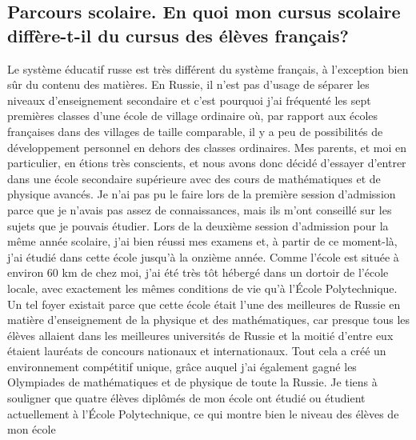\documentclass[a4paper,12pt]{article}
\begin{document}
\subsection{Parcours scolaire. En quoi mon cursus scolaire diffère-t-il du cursus des élèves français?} 

Le système éducatif russe est très différent du système français, à l'exception bien sûr du contenu des matières. En Russie, il n'est pas d'usage de séparer les niveaux d'enseignement secondaire et c'est pourquoi j'ai fréquenté les sept premières classes d'une école de village ordinaire où, par rapport aux écoles françaises dans des villages de taille comparable, il y a peu de possibilités de développement personnel en dehors des classes ordinaires. Mes parents, et moi en particulier, en étions très conscients, et nous avons donc décidé d'essayer d'entrer dans une école secondaire supérieure avec des cours de mathématiques et de physique avancés. Je n'ai pas pu le faire lors de la première session d'admission parce que je n'avais pas assez de connaissances, mais ils m'ont conseillé sur les sujets que je pouvais étudier.  Lors de la deuxième session d'admission pour la même année scolaire, j'ai bien réussi mes examens et, à partir de ce moment-là, j'ai étudié dans cette école jusqu'à la onzième année. Comme l'école est située à environ 60 km de chez moi, j'ai été très tôt hébergé dans un dortoir de l'école locale, avec exactement les mêmes conditions de vie qu'à l'École Polytechnique. Un tel foyer existait parce que cette école était l'une des meilleures de Russie en matière d'enseignement de la physique et des mathématiques, car presque tous les élèves allaient dans les meilleures universités de Russie et la moitié d'entre eux étaient lauréats de concours nationaux et internationaux. Tout cela a créé un environnement compétitif unique, grâce auquel j'ai également gagné les Olympiades de mathématiques et de physique de toute la Russie. Je tiens à souligner que quatre élèves diplômés de mon école ont étudié ou étudient actuellement à l'École Polytechnique, ce qui montre bien le niveau des élèves de mon école
\end{document}
